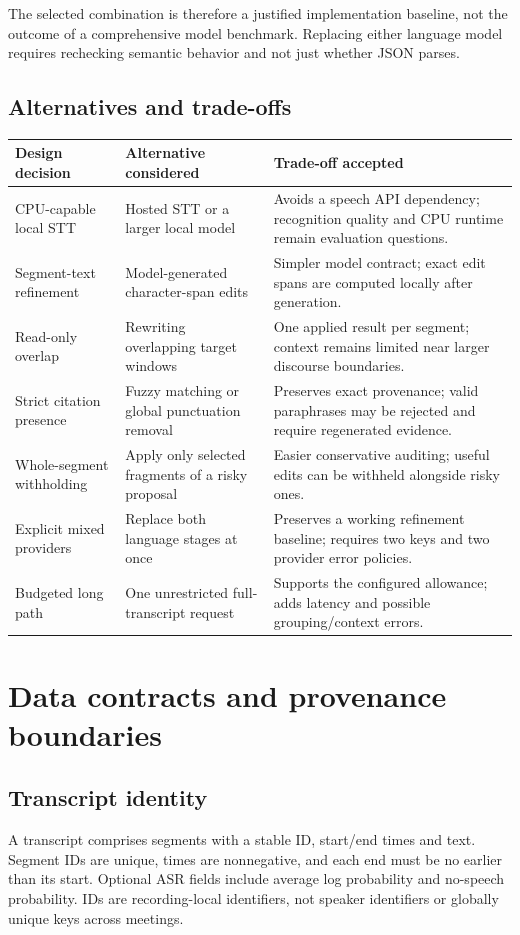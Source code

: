 \documentclass[11pt,a4paper]{article}
\begin{document}
The selected combination is therefore a justified implementation baseline, not the outcome of a comprehensive model benchmark. Replacing either language model requires rechecking semantic behavior and not just whether JSON parses.

\subsection{Alternatives and trade-offs}
\begin{tabularx}{\textwidth}{@{}p{}YY@{}}\toprule
Design decision & Alternative considered & Trade-off accepted\\\midrule
CPU-capable local STT & Hosted STT or a larger local model & Avoids a speech API dependency; recognition quality and CPU runtime remain evaluation questions.\\
Segment-text refinement & Model-generated character-span edits & Simpler model contract; exact edit spans are computed locally after generation.\\
Read-only overlap & Rewriting overlapping target windows & One applied result per segment; context remains limited near larger discourse boundaries.\\
Strict citation presence & Fuzzy matching or global punctuation removal & Preserves exact provenance; valid paraphrases may be rejected and require regenerated evidence.\\
Whole-segment withholding & Apply only selected fragments of a risky proposal & Easier conservative auditing; useful edits can be withheld alongside risky ones.\\
Explicit mixed providers & Replace both language stages at once & Preserves a working refinement baseline; requires two keys and two provider error policies.\\
Budgeted long path & One unrestricted full-transcript request & Supports the configured allowance; adds latency and possible grouping/context errors.\\\bottomrule
\end{tabularx}

\section{Data contracts and provenance boundaries}
\subsection{Transcript identity}
A transcript comprises segments with a stable ID, start/end times and text. Segment IDs are unique, times are nonnegative, and each end must be no earlier than its start. Optional ASR fields include average log probability and no-speech probability. IDs are recording-local identifiers, not speaker identifiers or globally unique keys across meetings.
\end{document}
